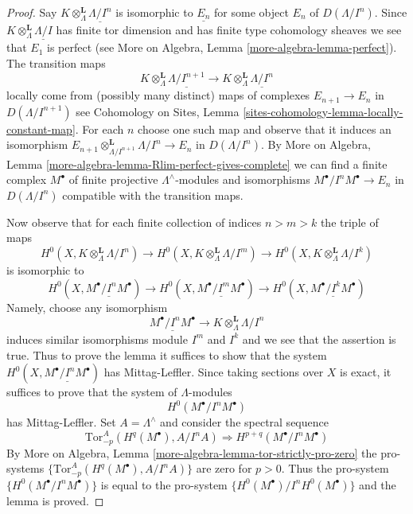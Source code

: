 \documentclass[10pt,a4paper]{amsart}
\theoremstyle{plain}
\theoremstyle{definition}
\theoremstyle{remark}
\numberwithin{equation}{subsection}
\begin{document}
\begin{proof}
Say $K \otimes_\Lambda^\mathbf{L} \underline{\Lambda/I^n}$ is isomorphic
to $\underline{E_n}$ for some object $E_n$ of $D(\Lambda/I^n)$.
Since $K \otimes_\Lambda^\mathbf{L} \underline{\Lambda/I}$ has
finite tor dimension and has finite type cohomology sheaves
we see that $E_1$ is perfect (see
More on Algebra, Lemma \ref{more-algebra-lemma-perfect}). The transition maps
$$
K \otimes_\Lambda^\mathbf{L} \underline{\Lambda/I^{n + 1}}
\to
K \otimes_\Lambda^\mathbf{L} \underline{\Lambda/I^n}
$$
locally come from (possibly many distinct) maps of complexes
$E_{n + 1} \to E_n$ in $D(\Lambda/I^{n + 1})$ see
Cohomology on Sites, Lemma \ref{sites-cohomology-lemma-locally-constant-map}.
For each $n$ choose one such map and observe that it induces
an isomorphism
$E_{n + 1} \otimes_{\Lambda/I^{n + 1}}^\mathbf{L} \Lambda/I^n \to E_n$
in $D(\Lambda/I^n)$. By
More on Algebra, Lemma \ref{more-algebra-lemma-Rlim-perfect-gives-complete}
we can find a finite complex $M^\bullet$ of finite projective
$\Lambda^\wedge$-modules and isomorphisms $M^\bullet/I^nM^\bullet \to E_n$
in $D(\Lambda/I^n)$ compatible with the transition maps.

\medskip\noindent
Now observe that for each finite collection of indices
$n > m > k$ the triple of maps
$$
H^0(X, K \otimes_\Lambda^\mathbf{L} \Lambda/I^n)
\to
H^0(X, K \otimes_\Lambda^\mathbf{L} \Lambda/I^m)
\to
H^0(X, K \otimes_\Lambda^\mathbf{L} \Lambda/I^k)
$$
is isomorphic to
$$
H^0(X, \underline{M^\bullet/I^nM^\bullet})
\to
H^0(X, \underline{M^\bullet/I^mM^\bullet})
\to
H^0(X, \underline{M^\bullet/I^kM^\bullet})
$$
Namely, choose any isomorphism
$$
\underline{M^\bullet/I^nM^\bullet} \to
K \otimes_\Lambda^\mathbf{L} \Lambda/I^n
$$
induces similar isomorphisms module $I^m$ and $I^k$ and we see that
the assertion is true. Thus to prove the lemma it suffices to show that
the system
$H^0(X, \underline{M^\bullet/I^nM^\bullet})$ has Mittag-Leffler.
Since taking sections over $X$ is exact, it suffices to prove that
the system of $\Lambda$-modules
$$
H^0(M^\bullet/I^nM^\bullet)
$$
has Mittag-Leffler. Set $A = \Lambda^\wedge$ and consider the spectral
sequence
$$
\text{Tor}_{-p}^A(H^q(M^\bullet), A/I^nA) \Rightarrow
H^{p + q}(M^\bullet/I^nM^\bullet)
$$
By More on Algebra, Lemma \ref{more-algebra-lemma-tor-strictly-pro-zero}
the pro-systems $\{\text{Tor}_{-p}^A(H^q(M^\bullet), A/I^nA)\}$ are zero
for $p > 0$. Thus the pro-system $\{H^0(M^\bullet/I^nM^\bullet)\}$
is equal to the pro-system $\{H^0(M^\bullet)/I^nH^0(M^\bullet)\}$
and the lemma is proved.
\end{proof}
\end{document}
